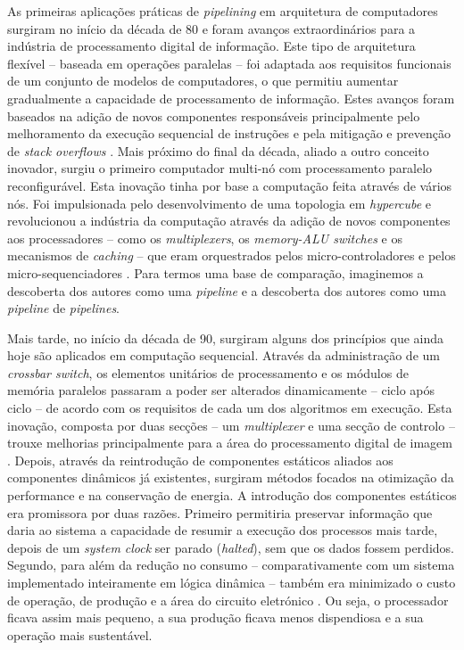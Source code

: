 \hspace{1cm}As primeiras aplicações práticas de \textit{pipelining} em arquitetura de computadores surgiram no início da década de 80 e foram avanços extraordinários para a indústria de processamento digital de informação. Este tipo de arquitetura flexível -- baseada em operações paralelas -- foi adaptada aos requisitos funcionais de um conjunto de modelos de computadores, o que permitiu aumentar gradualmente a capacidade de processamento de informação. Estes avanços foram baseados na adição de novos componentes responsáveis principalmente pelo melhoramento da execução sequencial de instruções e pela mitigação e prevenção de \textit{stack overflows} \cite{potash1984flexible}. Mais próximo do final da década, aliado a outro conceito inovador, surgiu o primeiro computador multi-nó com processamento paralelo reconfigurável. Esta inovação tinha por base a computação feita através de vários nós. Foi impulsionada pelo desenvolvimento de uma topologia em \textit{hypercube} e revolucionou a indústria da computação através da adição de novos componentes aos processadores -- como os \textit{multiplexers}, os \textit{memory-ALU switches} e os mecanismos de \textit{caching} -- que eram orquestrados pelos micro-controladores e pelos micro-sequenciadores \cite{nosenchuck1989multinode}. Para termos uma base de comparação, imaginemos a descoberta dos autores  como uma \textit{pipeline} e a descoberta dos autores  como uma \textit{pipeline} de \textit{pipelines}. 

\hspace{1cm}Mais tarde, no início da década de 90, surgiram alguns dos princípios que ainda hoje são aplicados em computação sequencial. Através da administração de um \textit{crossbar switch}, os elementos unitários de processamento e os módulos de memória paralelos passaram a poder ser alterados dinamicamente -- ciclo após ciclo -- de acordo com os requisitos de cada um dos algoritmos em execução. Esta inovação, composta por duas secções -- um \textit{multiplexer} e uma secção de controlo -- trouxe melhorias principalmente para a área do processamento digital de imagem \cite{hiller1992highly}. Depois, através da reintrodução de componentes estáticos aliados aos componentes dinâmicos já existentes, surgiram métodos focados na otimização da performance e na conservação de energia. A introdução dos componentes estáticos era promissora por duas razões. Primeiro permitiria preservar informação que daria ao sistema a capacidade de resumir a execução dos processos mais tarde, depois de um \textit{system clock} ser parado (\textit{halted}), sem que os dados fossem perdidos. Segundo, para além da redução no consumo -- comparativamente com um sistema implementado inteiramente em lógica dinâmica -- também era minimizado o custo de operação, de produção e a área do circuito eletrónico  \cite{donner1993computer}. Ou seja, o processador ficava assim mais pequeno, a sua produção ficava menos dispendiosa e a sua operação mais sustentável.


